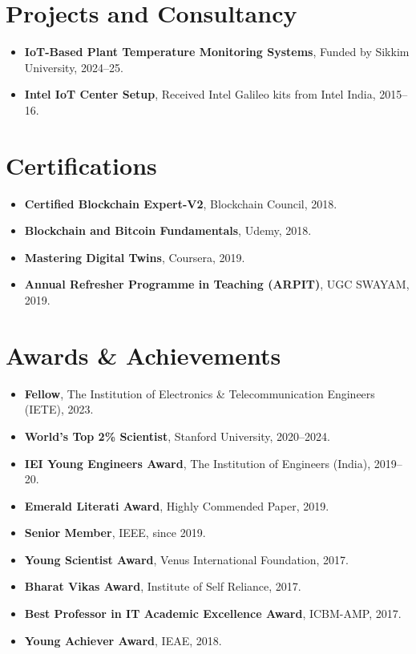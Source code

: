 \documentclass[10pt,a4paper]{article}
\begin{document}
	\section*{Projects and Consultancy}
	
	\begin{itemize}[leftmargin=0.15in]
		\item \textbf{IoT-Based Plant Temperature Monitoring Systems}, Funded by Sikkim University, 2024--25.
		\item \textbf{Intel IoT Center Setup}, Received Intel Galileo kits from Intel India, 2015--16.

	\end{itemize}
	
	\section*{Certifications}
	
	\begin{itemize}[leftmargin=0.15in]
		\item \textbf{Certified Blockchain Expert-V2}, Blockchain Council, 2018.
		\item \textbf{Blockchain and Bitcoin Fundamentals}, Udemy, 2018.
		\item \textbf{Mastering Digital Twins}, Coursera, 2019.
		\item \textbf{Annual Refresher Programme in Teaching (ARPIT)}, UGC SWAYAM, 2019.
	\end{itemize}
	
	\section*{Awards \& Achievements}
	
	\begin{itemize}[leftmargin=0.15in]
		\item \textbf{Fellow}, The Institution of Electronics \& Telecommunication Engineers (IETE), 2023.
		\item \textbf{World's Top 2\% Scientist}, Stanford University, 2020--2024.
		\item \textbf{IEI Young Engineers Award}, The Institution of Engineers (India), 2019--20.
		\item \textbf{Emerald Literati Award}, Highly Commended Paper, 2019.
		\item \textbf{Senior Member}, IEEE, since 2019.
		\item \textbf{Young Scientist Award}, Venus International Foundation, 2017.
		\item \textbf{Bharat Vikas Award}, Institute of Self Reliance, 2017.
		\item \textbf{Best Professor in IT Academic Excellence Award}, ICBM-AMP, 2017.
		\item \textbf{Young Achiever Award}, IEAE, 2018.
	\end{itemize}
	
\end{document}

